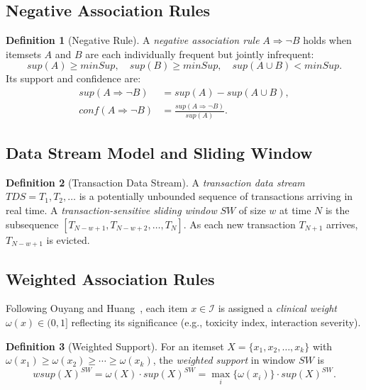 \documentclass[10pt,twocolumn]{article}
\theoremstyle{plain}
\theoremstyle{definition}
\newtheorem{definition}{Definition}[section]
\theoremstyle{remark}
\newcommand{\wsup}{\mathit{wsup}}
\newcommand{\minSup}{\mathit{minSup}}
\newcommand{\SW}{\mathit{SW}}
\begin{document}
\subsection{Negative Association Rules}

\begin{definition}[Negative Rule]
\label{def:negative_rule}
A \emph{negative association rule} $A \Rightarrow \lnot B$ holds
when itemsets $A$ and $B$ are each individually frequent but
jointly infrequent:
\[
  \mathit{sup}(A) \geq \minSup, \quad
  \mathit{sup}(B) \geq \minSup, \quad
  \mathit{sup}(A \cup B) < \minSup.
\]
Its support and confidence are:
\begin{align}
  \mathit{sup}(A \Rightarrow \lnot B)
    &= \mathit{sup}(A) - \mathit{sup}(A \cup B), \label{eq:neg_sup}\\
  \mathit{conf}(A \Rightarrow \lnot B)
    &= \frac{\mathit{sup}(A \Rightarrow \lnot B)}{\mathit{sup}(A)}. \label{eq:neg_conf}
\end{align}
\end{definition}

\subsection{Data Stream Model and Sliding Window}

\begin{definition}[Transaction Data Stream]
\label{def:stream}
A \emph{transaction data stream} $\mathit{TDS} = T_1, T_2, \ldots$ is
a potentially unbounded sequence of transactions arriving in real time.
A \emph{transaction-sensitive sliding window} $\SW$ of size $w$ at
time $N$ is the subsequence
$[T_{N-w+1}, T_{N-w+2}, \ldots, T_N]$.
As each new transaction $T_{N+1}$ arrives, $T_{N-w+1}$ is evicted.
\end{definition}

\subsection{Weighted Association Rules}

Following Ouyang and Huang~\cite{ouyang2015}, each item
$x \in \mathcal{I}$ is assigned a \emph{clinical weight}
$\omega(x) \in (0, 1]$ reflecting its significance (e.g., toxicity
index, interaction severity).

\begin{definition}[Weighted Support]
\label{def:wsup}
For an itemset $X = \{x_1, x_2, \ldots, x_k\}$ with
$\omega(x_1) \geq \omega(x_2) \geq \cdots \geq \omega(x_k)$,
the \emph{weighted support} in window $\SW$ is
\[
  \wsup(X)^{\SW}
    = \omega(X) \cdot \mathit{sup}(X)^{\SW}
    = \max_{i}\{\omega(x_i)\} \cdot \mathit{sup}(X)^{\SW}.
\]
\end{definition}
\end{document}
